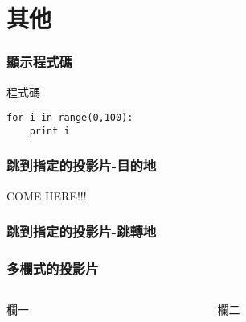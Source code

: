\documentclass[xcolor=svgnames]{beamer}
\begin{document}
\section{其他}
\begin{frame}[fragile]
\frametitle{顯示程式碼}
\begin{block}{程式碼}
\begin{verbatim}
for i in range(0,100):
    print i
\end{verbatim}
\end{block}
\end{frame}
\begin{frame}[label=here]
\frametitle{跳到指定的投影片-目的地}
COME HERE!!!
\end{frame}
\begin{frame}
\frametitle{跳到指定的投影片-跳轉地}
\hyperlink{here}{}
\end{frame}
\begin{frame}
\frametitle{多欄式的投影片}
\begin{columns}
\begin{column}{5cm} %
欄一
\end{column}
\begin{column}{5cm} %
欄二
\end{column}
\end{columns}
\end{frame}
\begin{frame}


\end{frame}
\end{document}
